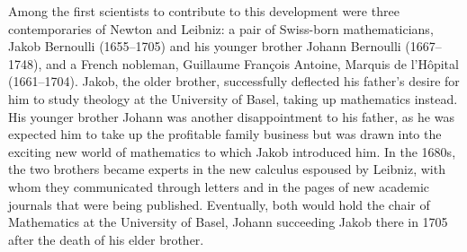 \documentclass[11pt]{article}
\begin{document}

Among the first scientists to contribute to this development were three contemporaries of Newton and Leibniz: a pair of Swiss-born mathematicians, Jakob Bernoulli (1655--1705) and his younger brother Johann Bernoulli (1667--1748), and a French nobleman, Guillaume Fran\c{c}ois Antoine, Marquis de l'H\^opital (1661--1704). Jakob, the older brother, successfully deflected his father's desire for him to study theology at the University of Basel, taking up mathematics instead. His younger brother Johann was another disappointment to his father, as he was expected him to take up the profitable family business but was drawn into the exciting new world of mathematics to which Jakob introduced him.  In the 1680s, the two brothers became experts in the new calculus espoused by Leibniz, with whom they communicated through letters and in the pages of new academic journals that were being published. Eventually, both would hold the chair of Mathematics at the University of Basel, Johann succeeding Jakob there in 1705 after the death of his elder brother.
\end{document}
